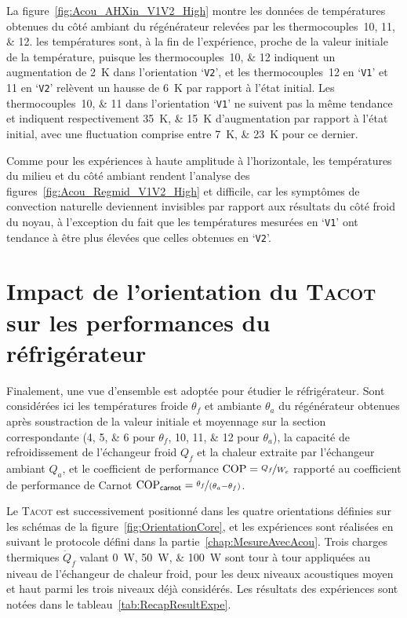 La figure~\ref{fig:Acou_AHXin_V1V2_High} montre les données de températures obtenues du côté ambiant du régénérateur relevées par les thermocouples~\numlist{10;11;12}. les températures  sont, à la fin de l'expérience, proche de la valeur initiale de la température, puisque les thermocouples~\numlist{10;12} indiquent un augmentation de \qty{2}{\kelvin} dans l'orientation `\texttt{V2}', et les thermocouples~\num{12} en `\texttt{V1}' et \num{11} en `\texttt{V2}' relèvent un hausse de \qty{6}{\kelvin} par rapport à l'état initial. Les thermocouples~\numlist{10;11} dans l'orientation `\texttt{V1}' ne suivent pas la même tendance et indiquent respectivement \qtylist{35;15}{\kelvin} d'augmentation par rapport à l'état initial, avec une fluctuation comprise entre \qtylist{7;23}{\kelvin} pour ce dernier.\medskip

Comme pour les expériences à haute amplitude à l'horizontale, les températures du milieu et du côté ambiant rendent l'analyse des figures~\ref{fig:Acou_Regmid_V1V2_High} et  difficile, car les symptômes de convection naturelle deviennent invisibles par rapport aux résultats du côté froid du noyau, à l'exception du fait que les températures mesurées en `\texttt{V1}' ont tendance à être plus élevées que celles obtenues en `\texttt{V2}'.\medskip

\section[Orientation du \textsc{Tacot} et impact sur les performances]{Impact de l'orientation du \textsc{Tacot} sur les performances du réfrigérateur}\label{chap:PerfConvNat}
Finalement, une vue d'ensemble est adoptée pour étudier le réfrigérateur. Sont considérées ici les températures froide $\theta_{f}$ et ambiante $\theta_{a}$ du régénérateur obtenues après soustraction de la valeur initiale et moyennage sur la section correspondante (\numlist{4;5;6} pour $\theta_{f}$, \numlist{10;11;12} pour $\theta_{a}$), la capacité de refroidissement de l'échangeur froid $Q_f$ et la chaleur extraite par l'échangeur ambiant $Q_a$, et le coefficient de performance $\mathrm{COP}=\nicefrac{Q_f}{W_e}$ rapporté au coefficient de performance de Carnot $\mathrm{COP}_{\sf carnot} = \nicefrac{\theta_f}{(\theta_a-\theta_f)}$.\medskip

Le \textsc{Tacot} est successivement positionné dans les quatre orientations définies sur les schémas de la figure~\ref{fig:OrientationCore}, et les expériences sont réalisées en suivant le protocole défini dans la partie~\ref{chap:MesureAvecAcou}. Trois charges thermiques $\dot Q_f$  valant \qtylist{0;50;100}{\watt} sont tour à tour appliquées au niveau de l'échangeur de chaleur froid, pour les deux niveaux acoustiques moyen et haut parmi les trois niveaux déjà considérés. Les résultats des expériences sont notées dans le tableau~\ref{tab:RecapResultExpe}.\medskip

